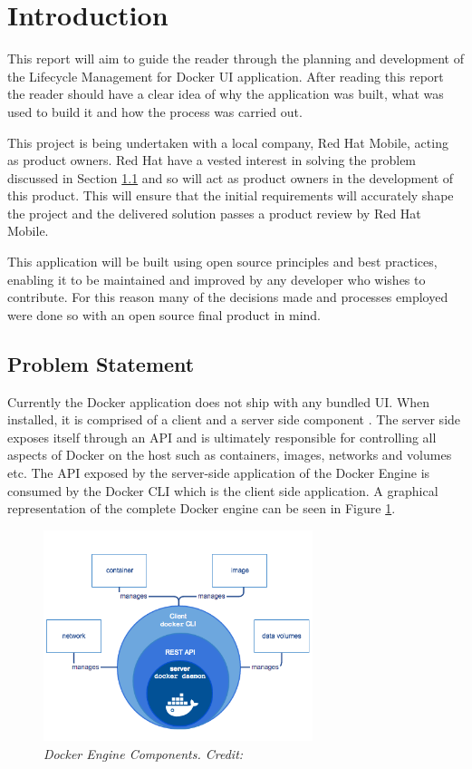 \section{Introduction}
\label{sec:intro}
This report will aim to guide the reader through the planning and development of the Lifecycle Management for Docker \gls{UI} application. After reading this report the reader should have a clear idea of why the application was built, what was used to build it and how the process was carried out.

This project is being undertaken with a local company, Red Hat Mobile, acting as product owners. Red Hat have a vested interest in solving the problem discussed in Section \ref{sub:problem} and so will act as product owners in the development of this product. This will ensure that the initial requirements will accurately shape the project and the delivered solution passes a product review by Red Hat Mobile.

This application will be built using open source principles and best practices, enabling it to be maintained and improved by any developer who wishes to contribute. For this reason many of the decisions made and processes employed were done so with an open source final product in mind.



\subsection{Problem Statement}
\label{sub:problem}
Currently the \gls{Docker} application does not ship with any bundled \gls{UI}. When installed, it is comprised of a client and a server side component \citep{Docker2017}. The server side exposes itself through an \gls{API} and is ultimately responsible for controlling all aspects of Docker on the host such as containers, images, networks and volumes etc. The API exposed by the server-side application of the Docker Engine is consumed by the Docker \gls{CLI} which is the client side application. A graphical representation of the complete Docker engine can be seen in Figure \ref{fig:docker_engine}.

\begin{figure}[!ht]
\centering
\includegraphics*[width=0.7\textwidth]{images/docker_engine}
\caption{\em Docker Engine Components. Credit: \citep{Docker2017}}
\label{fig:docker_engine}
\end{figure}

